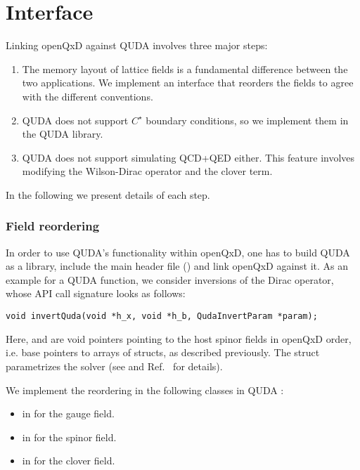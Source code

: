 \chapter{Interface}
\label{ch:p1:interface}

Linking openQxD against QUDA involves three major steps:

\begin{enumerate}
\item{The memory layout of lattice fields is a fundamental difference between the two applications. We implement an interface that reorders the fields to agree with the different conventions.}
\item{QUDA does not support $C^\star$ boundary conditions, so we implement them in the QUDA library.}
\item{QUDA does not support simulating QCD+QED either. This feature involves modifying the Wilson-Dirac operator and the clover term.}
\end{enumerate}

In the following we present details of each step.

\subsection{Field reordering}

In order to use QUDA's functionality within openQxD, one has to build QUDA as a library, include the main header file () and link openQxD against it. 
As an example for a QUDA function, we consider inversions of the Dirac operator, whose API call signature looks as follows:

\begin{verbatim}
void invertQuda(void *h_x, void *h_b, QudaInvertParam *param);
\end{verbatim}

Here,  and  are void pointers pointing to the host spinor fields in openQxD order, i.e. base pointers to arrays of  structs, as described previously. The  struct parametrizes the solver (see  and Ref.~\cite{QUDApaper} for details).


We implement the reordering in the following classes in QUDA \cite{QUDApaper}:
\begin{itemize}
  \item {} in  for the gauge field.
  \item {} in  for the spinor field.
  \item {} in  for the clover field.
\end{itemize}


